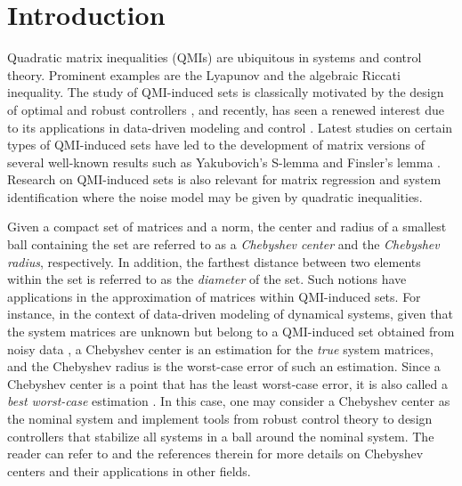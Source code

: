 \documentclass[pdflatex,sn-mathphys-num]{sn-jnl}%
\theoremstyle{thmstyleone}
\begin{document}
\section{Introduction}


Quadratic matrix inequalities (QMIs) are ubiquitous in systems and control theory. Prominent examples are the Lyapunov and the algebraic Riccati inequality. The study of QMI-induced sets is classically motivated by the design of optimal and robust controllers \cite{willems1971least,stoorvogel1990quadratic,scherer1999lecture,scherer2001lpv,skelton2017unified,scherer2006matrix}, and recently, has seen a renewed interest due to its applications in data-driven modeling and control \cite{van2020noisy,miller2022data,rapisarda2023orthogonal,van2023informativity}.  
Latest studies on certain types of QMI-induced sets have led to the development of matrix versions of several well-known results such as Yakubovich's S-lemma \cite{van2020noisy,van2023quadratic} and Finsler's lemma \cite{van2021matrix,meijer2024unified}. Research on QMI-induced sets is also relevant for matrix regression and system identification where the noise model may be given by quadratic inequalities. 

Given a compact set of matrices and a norm, the center and radius of a smallest ball containing the set are referred to as a \emph{Chebyshev center} and the \emph{Chebyshev radius}, respectively. In addition, the farthest distance between two elements within the set is referred to as the \emph{diameter} of the set. Such notions have applications in the approximation of matrices within QMI-induced sets. For instance, in the context of data-driven modeling of dynamical systems, given that the system matrices are unknown but belong to a QMI-induced set obtained from noisy data \cite{van2020noisy}, a Chebyshev center is an estimation for the \emph{true} system matrices, and the Chebyshev radius is the worst-case error of such an estimation. Since a Chebyshev center is a point that has the least worst-case error, it is also called a \emph{best worst-case} estimation \cite{beck2007regularization}. In this case, one may consider a Chebyshev center as the nominal system and implement tools from robust control theory to design controllers that stabilize all systems in a ball
around the nominal system. The reader can refer to \cite{alimov2021geometric} and the references therein for more details on Chebyshev centers and their applications in other fields.
\end{document}
